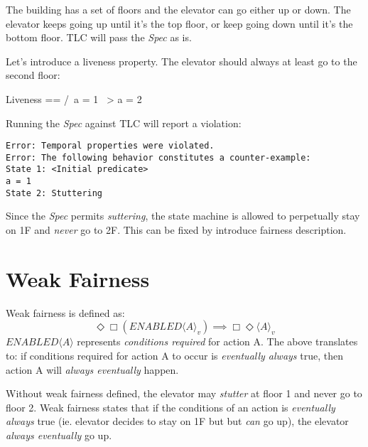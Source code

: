 \documentclass{report}
\begin{document}
The building has a set of floors and the elevator can go either up or down. The
elevator keeps going up until it's the top floor, or keep going down until it's
the bottom floor. TLC will pass the \textit{Spec} as is.\newline

Let's introduce a liveness property. The elevator should always at least go 
to the second floor:\newline
\begin{tla}
Liveness == 
    /\ a = 1 ~> a = 2
\end{tla}
\begin{tlatex}
%
%
\end{tlatex}
\newline

Running the \textit{Spec} against TLC will report a violation:

\begin{verbatim}
Error: Temporal properties were violated.
Error: The following behavior constitutes a counter-example:
State 1: <Initial predicate>
a = 1
State 2: Stuttering
\end{verbatim}

Since the \textit{Spec} permits \textit{suttering}, the state machine is allowed
to perpetually stay on 1F and \textit{never} go to 2F. This can be fixed by
introduce fairness description.

\section{Weak Fairness}

Weak fairness is defined as:\newline
\begin{equation} 
\Diamond\Box(ENABLED\langle A \rangle _v) \implies \Box\Diamond\langle A \rangle _v
\end{equation}
$ENABLED\langle A \rangle$ represents \textit{conditions required} for action A.
The above translates to: if conditions required for action A to occur is
\textit{eventually always} true, then action A will \textit{always eventually}
happen.\newline 

Without weak fairness defined, the elevator may \textit{stutter} at floor 1 and
never go to floor 2. Weak fairness states that if the conditions of an action is
\textit{eventually always} true (ie. elevator decides to stay on 1F but but
\textit{can} go up), the elevator \textit{always eventually} go up.\newline
\end{document}

